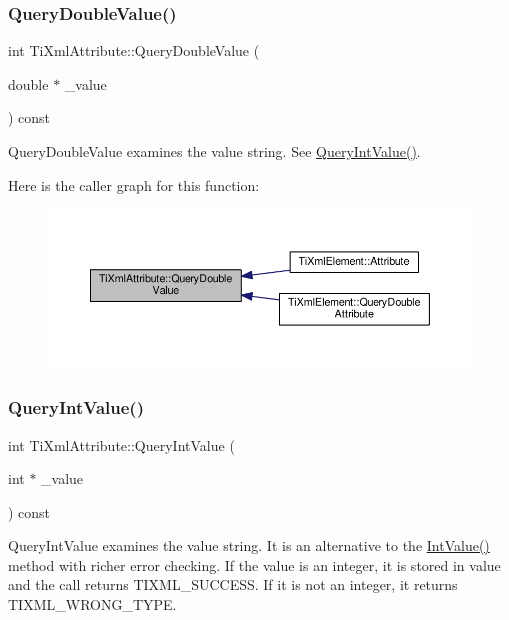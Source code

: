 \subsubsection{\texorpdfstring{Query\+Double\+Value()}{QueryDoubleValue()}}
{\footnotesize\ttfamily int Ti\+Xml\+Attribute\+::\+Query\+Double\+Value (\begin{DoxyParamCaption}\item[{double $\ast$}]{\+\_\+value }\end{DoxyParamCaption}) const}



Query\+Double\+Value examines the value string. See \hyperlink{class_ti_xml_attribute_a6caa8090d2fbb7966700a16e45ed33de}{Query\+Int\+Value()}. 

Here is the caller graph for this function\+:\nopagebreak
\begin{figure}[H]
\begin{center}
\leavevmode
\includegraphics[width=350pt]{class_ti_xml_attribute_a6fa41b710c1b79de37a97004aa600c06_icgraph}
\end{center}
\end{figure}
\mbox{\label{class_ti_xml_attribute_a6caa8090d2fbb7966700a16e45ed33de}} 
\subsubsection{\texorpdfstring{Query\+Int\+Value()}{QueryIntValue()}}
{\footnotesize\ttfamily int Ti\+Xml\+Attribute\+::\+Query\+Int\+Value (\begin{DoxyParamCaption}\item[{int $\ast$}]{\+\_\+value }\end{DoxyParamCaption}) const}

Query\+Int\+Value examines the value string. It is an alternative to the \hyperlink{class_ti_xml_attribute_ac8501370b065df31a35003c81d87cef2}{Int\+Value()} method with richer error checking. If the value is an integer, it is stored in \textquotesingle{}value\textquotesingle{} and the call returns T\+I\+X\+M\+L\+\_\+\+S\+U\+C\+C\+E\+SS. If it is not an integer, it returns T\+I\+X\+M\+L\+\_\+\+W\+R\+O\+N\+G\+\_\+\+T\+Y\+PE.

